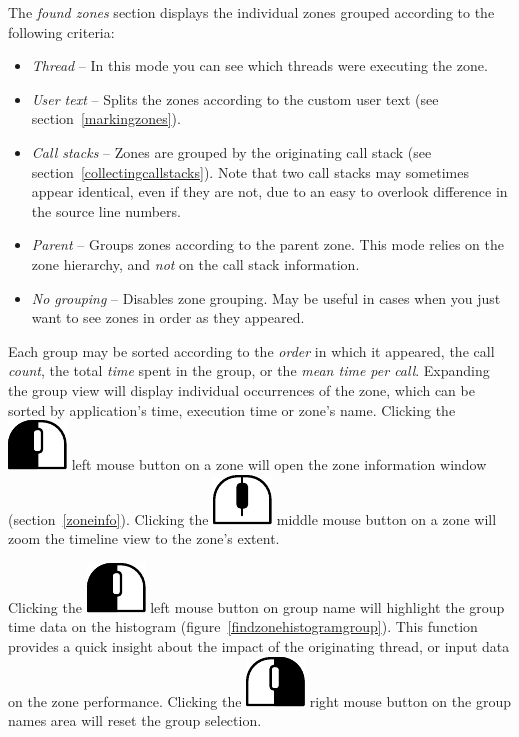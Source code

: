 \documentclass[hidelinks,titlepage,a4paper]{article}
\newcommand{\LMB}{\includegraphics[height=.8\baselineskip]{icons/lmb}}
\newcommand{\RMB}{\includegraphics[height=.8\baselineskip]{icons/rmb}}
\newcommand{\MMB}{\includegraphics[height=.8\baselineskip]{icons/mmb}}
\begin{document}
The \emph{found zones} section displays the individual zones grouped according to the following criteria:

\begin{itemize}
\item \emph{Thread} -- In this mode you can see which threads were executing the zone.
\item \emph{User text} -- Splits the zones according to the custom user text (see section~\ref{markingzones}).
\item \emph{Call stacks} -- Zones are grouped by the originating call stack (see section~\ref{collectingcallstacks}). Note that two call stacks may sometimes appear identical, even if they are not, due to an easy to overlook difference in the source line numbers.
\item \emph{Parent} -- Groups zones according to the parent zone. This mode relies on the zone hierarchy, and \emph{not} on the call stack information.
\item \emph{No grouping} -- Disables zone grouping. May be useful in cases when you just want to see zones in order as they appeared.
\end{itemize}

Each group may be sorted according to the \emph{order} in which it appeared, the call \emph{count}, the total \emph{time} spent in the group, or the \emph{mean time per call}. Expanding the group view will display individual occurrences of the zone, which can be sorted by application's time, execution time or zone's name. Clicking the \LMB{} left mouse button on a zone will open the zone information window (section~\ref{zoneinfo}). Clicking the \MMB{} middle mouse button on a zone will zoom the timeline view to the zone's extent.

Clicking the \LMB{} left mouse button on group name will highlight the group time data on the histogram (figure~\ref{findzonehistogramgroup}). This function provides a quick insight about the impact of the originating thread, or input data on the zone performance. Clicking the \RMB{} right mouse button on the group names area will reset the group selection.
\end{document}
